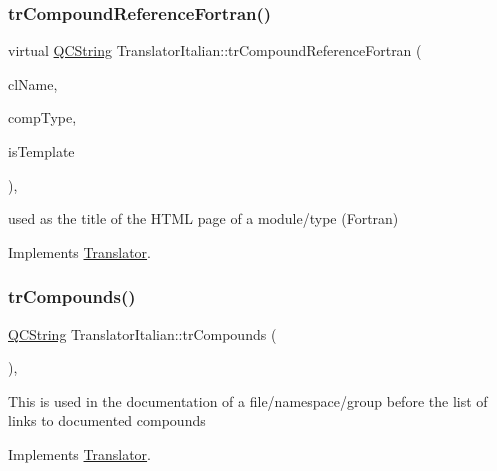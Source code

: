 \subsubsection{\texorpdfstring{trCompoundReferenceFortran()}{trCompoundReferenceFortran()}}
{\footnotesize\ttfamily virtual \mbox{\hyperlink{class_q_c_string}{Q\+C\+String}} Translator\+Italian\+::tr\+Compound\+Reference\+Fortran (\begin{DoxyParamCaption}\item[{const char $\ast$}]{cl\+Name,  }\item[{\mbox{\hyperlink{class_class_def_ae70cf86d35fe954a94c566fbcfc87939}{Class\+Def\+::\+Compound\+Type}}}]{comp\+Type,  }\item[{bool}]{is\+Template }\end{DoxyParamCaption})\hspace{0.3cm}{\ttfamily [inline]}, {\ttfamily [virtual]}}

used as the title of the H\+T\+ML page of a module/type (Fortran) 

Implements \mbox{\hyperlink{class_translator}{Translator}}.

\mbox{\label{class_translator_italian_abf0c32fda68ed838bf3796d4bdea6cca}} 
\subsubsection{\texorpdfstring{trCompounds()}{trCompounds()}}
{\footnotesize\ttfamily \mbox{\hyperlink{class_q_c_string}{Q\+C\+String}} Translator\+Italian\+::tr\+Compounds (\begin{DoxyParamCaption}{ }\end{DoxyParamCaption})\hspace{0.3cm}{\ttfamily [inline]}, {\ttfamily [virtual]}}

This is used in the documentation of a file/namespace/group before the list of links to documented compounds 

Implements \mbox{\hyperlink{class_translator}{Translator}}.

\mbox{\label{class_translator_italian_ac5021acc5a905b4d82c01f66f9eb178f}} 

